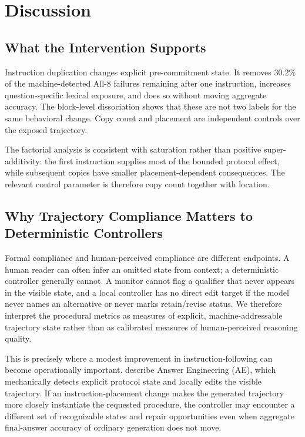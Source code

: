 \documentclass[10pt]{article}
\begin{document}
\section{Discussion}
\subsection{What the Intervention Supports}
Instruction duplication changes explicit pre-commitment state. It removes 30.2\% of the machine-detected All-8 failures remaining after one instruction, increases question-specific lexical exposure, and does so without moving aggregate accuracy. The block-level dissociation shows that these are not two labels for the same behavioral change. Copy count and placement are independent controls over the exposed trajectory.

The factorial analysis is consistent with saturation rather than positive super-additivity: the first instruction supplies most of the bounded protocol effect, while subsequent copies have smaller placement-dependent consequences. The relevant control parameter is therefore copy count together with location.

\subsection{Why Trajectory Compliance Matters to Deterministic Controllers}
Formal compliance and human-perceived compliance are different endpoints. A human reader can often infer an omitted state from context; a deterministic controller generally cannot. A monitor cannot flag a qualifier that never appears in the visible state, and a local controller has no direct edit target if the model never names an alternative or never marks retain/revise status. We therefore interpret the procedural metrics as measures of explicit, machine-addressable trajectory state rather than as calibrated measures of human-perceived reasoning quality.

This is precisely where a modest improvement in instruction-following can become operationally important. \citet{lavrenko2026ae} describe Answer Engineering (AE), which mechanically detects explicit protocol state and locally edits the visible trajectory. If an instruction-placement change makes the generated trajectory more closely instantiate the requested procedure, the controller may encounter a different set of recognizable states and repair opportunities even when aggregate final-answer accuracy of ordinary generation does not move.
\end{document}
